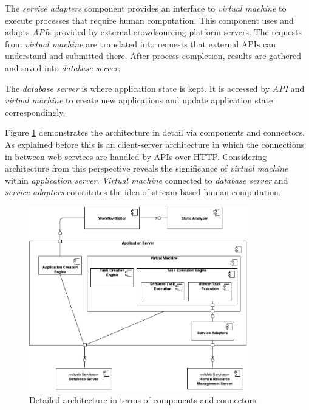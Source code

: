 The \textit{service adapters} component provides an interface to \textit{virtual machine} 
to execute processes that require human computation. This component uses and 
adapts \textit{API}s provided by external crowdsourcing platform servers. The requests 
from \textit{virtual machine} are translated into requests that external APIs can 
understand and submitted there. After process completion, results are gathered and 
saved into \textit{database server}.

The \textit{database server} is where application state is kept. It is accessed by 
\textit{API} and \textit{virtual machine} to create new applications and update 
application state correspondingly.

Figure \ref{fig:componentconnector} demonstrates the architecture in detail 
via components and connectors. As explained before this is an client-server 
architecture in which the connections in between web services are handled 
by APIs over HTTP. Considering architecture from this perspective reveals the 
significance of \textit{virtual machine} within \textit{application server}. 
\textit{Virtual machine} connected to \textit{database server} and 
\textit{service adapters} constitutes the idea of stream-based human computation.

\begin{figure}[ht]
	\centering
	\includegraphics[width=0.85\textwidth]{figures/architecture/ComponentConnector.pdf}
	\caption{Detailed architecture in terms of components and connectors.}
	\label{fig:componentconnector}
\end{figure}

